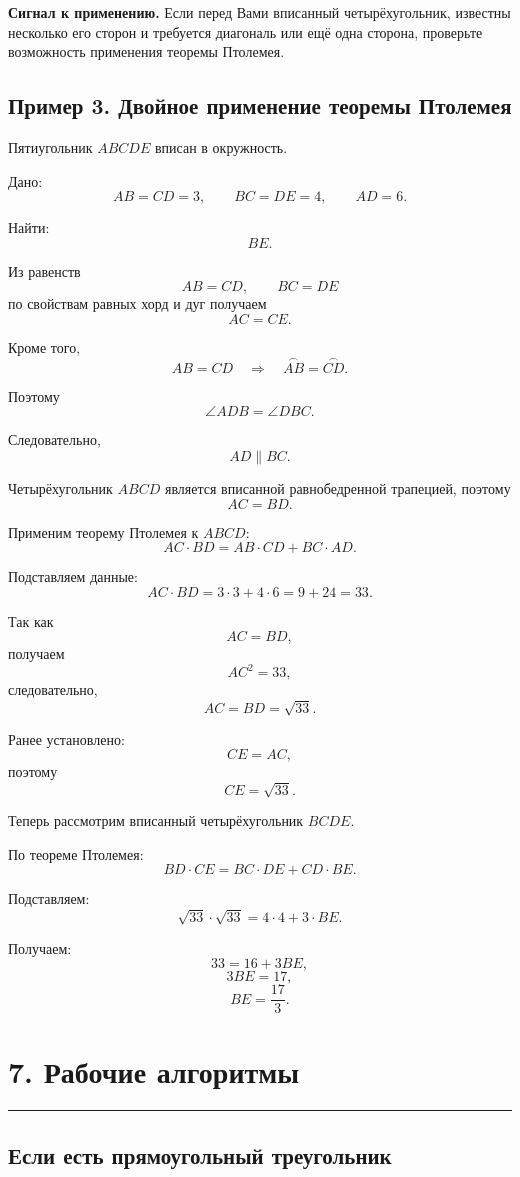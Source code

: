 \documentclass[a4paper,12pt]{article}
\newcommand{\sectionrule}{
  \par
  \vspace{0.2em}
  \noindent
  \textcolor{accent}{\rule{\linewidth}{0.7pt}}
  \vspace{0.35em}
}
\newcommand{\key}[1]{\textbf{\textcolor{darkaccent}{#1}}}
\begin{document}
\key{Сигнал к применению.}
Если перед Вами вписанный четырёхугольник,
известны несколько его сторон
и требуется диагональ или ещё одна сторона,
проверьте возможность применения теоремы Птолемея.

\subsection*{Пример 3. Двойное применение теоремы Птолемея}

Пятиугольник \(ABCDE\) вписан в окружность.

Дано:
\[
AB=CD=3,
\qquad
BC=DE=4,
\qquad
AD=6.
\]

Найти:
\[
BE.
\]

Из равенств
\[
AB=CD,
\qquad
BC=DE
\]
по свойствам равных хорд и дуг получаем
\[
AC=CE.
\]

Кроме того,
\[
AB=CD
\quad\Rightarrow\quad
\overset{\frown}{AB}
=
\overset{\frown}{CD}.
\]

Поэтому
\[
\angle ADB=\angle DBC.
\]

Следовательно,
\[
AD\parallel BC.
\]

Четырёхугольник \(ABCD\) является вписанной
равнобедренной трапецией, поэтому
\[
AC=BD.
\]

Применим теорему Птолемея к \(ABCD\):
\[
AC\cdot BD
=
AB\cdot CD
+
BC\cdot AD.
\]

Подставляем данные:
\[
AC\cdot BD
=
3\cdot3+4\cdot6
=
9+24
=
33.
\]

Так как
\[
AC=BD,
\]
получаем
\[
AC^2=33,
\]
следовательно,
\[
AC=BD=\sqrt{33}.
\]

Ранее установлено:
\[
CE=AC,
\]
поэтому
\[
CE=\sqrt{33}.
\]

Теперь рассмотрим вписанный четырёхугольник \(BCDE\).

По теореме Птолемея:
\[
BD\cdot CE
=
BC\cdot DE
+
CD\cdot BE.
\]

Подставляем:
\[
\sqrt{33}\cdot\sqrt{33}
=
4\cdot4+3\cdot BE.
\]

Получаем:
\[
33=16+3BE,
\]
\[
3BE=17,
\]
\[
\boxed{BE=\frac{17}{3}}.
\]

\section*{7. Рабочие алгоритмы}
\sectionrule

\subsection*{Если есть прямоугольный треугольник}
\end{document}
